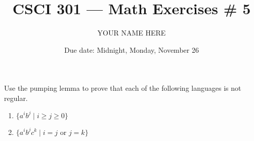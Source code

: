 \documentclass{article}
\title{CSCI 301 --- Math Exercises \# 5}
\author{YOUR NAME HERE}
\date{Due date:  Midnight, Monday, November 26}
\begin{document}
\maketitle

\noindent
Use the pumping lemma to prove that each of the following languages is
not regular.

\begin{enumerate}
\item
  $\{a^ib^j\mid i \geq j \geq 0\}$


\item
  $\{a^ib^jc^k \mid i = j \mbox{ or } j = k\}$


\end{enumerate}
\end{document}
